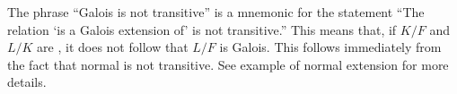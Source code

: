 \documentclass[12pt]{article}
\begin{document}
The phrase ``Galois is not transitive'' is a mnemonic for the statement ``The relation `is a Galois extension of' is not transitive.''  This means that, if $K/F$ and $L/K$ are , it does not follow that $L/F$ is Galois.  This follows immediately from the fact that normal is not transitive.  See example of normal extension for more details.
\end{document}
